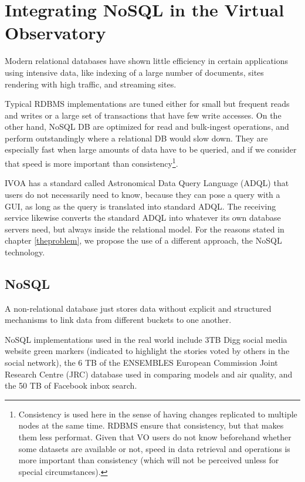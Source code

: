 \chapter{Integrating NoSQL in the Virtual Observatory}

Modern relational databases have shown little efficiency in certain applications using intensive data, like indexing of a large number of documents, sites rendering with high traffic, and streaming sites.

Typical RDBMS implementations are tuned either for small but frequent reads and writes or a large set of transactions that have few write accesses. On the other
hand,
NoSQL DB are optimized for read and
bulk-ingest
operations, and perform outstandingly where a relational DB would slow down. They are especially fast when large amounts of data have to be queried, and if we consider that speed is more important than
consistency\footnote{Consistency is used here in the sense of having changes replicated to multiple nodes at the same time. RDBMS ensure that consistency, but that makes them less performat. Given that VO users do not know beforehand whether some datasets are available or not, speed in data retrieval and operations is more important than consistency (which will not be perceived unless for special circumstances).}.

IVOA has a standard called Astronomical Data Query Language (ADQL) that users do not necessarily need to know, because
they %
can pose a query with a GUI, as long as the query is translated into standard ADQL. The receiving service likewise converts the standard ADQL into whatever its own database servers need, but always inside
the
relational model. For the reasons stated in chapter \ref{theproblem}, we propose the use of a different approach, the NoSQL technology.


\section{NoSQL} %
\label{sec:nosql}

A non-relational database just stores data without explicit and structured mechanisms to link data from different buckets to one another.

NoSQL implementations used in the real world include 3TB Digg
social media website
green markers (indicated to highlight the stories voted by others in the social network), the 6 TB of
the ENSEMBLES
European Commission
Joint Research Centre (JRC)
database used in comparing models and air quality, and the 50 TB of Facebook inbox search. 

